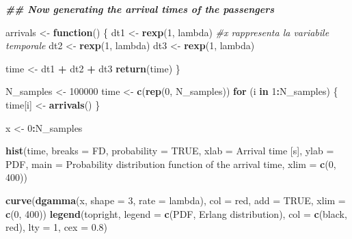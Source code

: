 \documentclass[
]{article}
\newenvironment{Shaded}{\begin{snugshade}}{\end{snugshade}}
\newcommand{\AttributeTok}[1]{\textcolor[rgb]{0.13,0.29,0.53}{#1}}
\newcommand{\CommentTok}[1]{\textcolor[rgb]{0.56,0.35,0.01}{\textit{#1}}}
\newcommand{\ConstantTok}[1]{\textcolor[rgb]{0.56,0.35,0.01}{#1}}
\newcommand{\ControlFlowTok}[1]{\textcolor[rgb]{0.13,0.29,0.53}{\textbf{#1}}}
\newcommand{\DecValTok}[1]{\textcolor[rgb]{0.00,0.00,0.81}{#1}}
\newcommand{\DocumentationTok}[1]{\textcolor[rgb]{0.56,0.35,0.01}{\textbf{\textit{#1}}}}
\newcommand{\FloatTok}[1]{\textcolor[rgb]{0.00,0.00,0.81}{#1}}
\newcommand{\FunctionTok}[1]{\textcolor[rgb]{0.13,0.29,0.53}{\textbf{#1}}}
\newcommand{\NormalTok}[1]{#1}
\newcommand{\OtherTok}[1]{\textcolor[rgb]{0.56,0.35,0.01}{#1}}
\newcommand{\SpecialCharTok}[1]{\textcolor[rgb]{0.81,0.36,0.00}{\textbf{#1}}}
\newcommand{\StringTok}[1]{\textcolor[rgb]{0.31,0.60,0.02}{#1}}
\begin{document}
\begin{Shaded}
\begin{Highlighting}[]
\DocumentationTok{\#\# Now generating the arrival times of the passengers}

\NormalTok{arrivals }\OtherTok{\textless{}{-}} \ControlFlowTok{function}\NormalTok{() \{}
\NormalTok{  dt1 }\OtherTok{\textless{}{-}} \FunctionTok{rexp}\NormalTok{(}\DecValTok{1}\NormalTok{, lambda)   }\CommentTok{\#x rappresenta la variabile temporale }
\NormalTok{  dt2 }\OtherTok{\textless{}{-}} \FunctionTok{rexp}\NormalTok{(}\DecValTok{1}\NormalTok{, lambda)}
\NormalTok{  dt3 }\OtherTok{\textless{}{-}} \FunctionTok{rexp}\NormalTok{(}\DecValTok{1}\NormalTok{, lambda)}
  
\NormalTok{  time }\OtherTok{\textless{}{-}}\NormalTok{ dt1 }\SpecialCharTok{+}\NormalTok{ dt2 }\SpecialCharTok{+}\NormalTok{ dt3}
  \FunctionTok{return}\NormalTok{(time)}
\NormalTok{\}}


\NormalTok{N\_samples }\OtherTok{\textless{}{-}} \DecValTok{100000}
\NormalTok{time }\OtherTok{\textless{}{-}} \FunctionTok{c}\NormalTok{(}\FunctionTok{rep}\NormalTok{(}\DecValTok{0}\NormalTok{, N\_samples))}
\ControlFlowTok{for}\NormalTok{ (i }\ControlFlowTok{in} \DecValTok{1}\SpecialCharTok{:}\NormalTok{N\_samples) \{}
\NormalTok{  time[i] }\OtherTok{\textless{}{-}} \FunctionTok{arrivals}\NormalTok{()}
\NormalTok{\}}

\NormalTok{x }\OtherTok{\textless{}{-}} \DecValTok{0}\SpecialCharTok{:}\NormalTok{N\_samples}

\FunctionTok{hist}\NormalTok{(time, }\AttributeTok{breaks =} \StringTok{\textquotesingle{}FD\textquotesingle{}}\NormalTok{,}
     \AttributeTok{probability =} \ConstantTok{TRUE}\NormalTok{, }\AttributeTok{xlab =} \StringTok{\textquotesingle{}Arrival time [s]\textquotesingle{}}\NormalTok{, }\AttributeTok{ylab =} \StringTok{\textquotesingle{}PDF\textquotesingle{}}\NormalTok{, }
     \AttributeTok{main =} \StringTok{\textquotesingle{}Probability distribution function of the arrival time\textquotesingle{}}\NormalTok{, }\AttributeTok{xlim =} \FunctionTok{c}\NormalTok{(}\DecValTok{0}\NormalTok{, }\DecValTok{400}\NormalTok{))}

\FunctionTok{curve}\NormalTok{(}\FunctionTok{dgamma}\NormalTok{(x, }\AttributeTok{shape =} \DecValTok{3}\NormalTok{, }\AttributeTok{rate =}\NormalTok{ lambda), }\AttributeTok{col =} \StringTok{\textquotesingle{}red\textquotesingle{}}\NormalTok{, }\AttributeTok{add =} \ConstantTok{TRUE}\NormalTok{, }\AttributeTok{xlim =} \FunctionTok{c}\NormalTok{(}\DecValTok{0}\NormalTok{, }\DecValTok{400}\NormalTok{))}
\FunctionTok{legend}\NormalTok{(}\StringTok{\textquotesingle{}topright\textquotesingle{}}\NormalTok{, }\AttributeTok{legend =} \FunctionTok{c}\NormalTok{(}\StringTok{\textquotesingle{}PDF\textquotesingle{}}\NormalTok{, }\StringTok{\textquotesingle{}Erlang distribution\textquotesingle{}}\NormalTok{),}
       \AttributeTok{col =} \FunctionTok{c}\NormalTok{(}\StringTok{\textquotesingle{}black\textquotesingle{}}\NormalTok{, }\StringTok{\textquotesingle{}red\textquotesingle{}}\NormalTok{), }\AttributeTok{lty =} \DecValTok{1}\NormalTok{, }\AttributeTok{cex =} \FloatTok{0.8}\NormalTok{)}
\end{Highlighting}
\end{Shaded}
\end{document}
